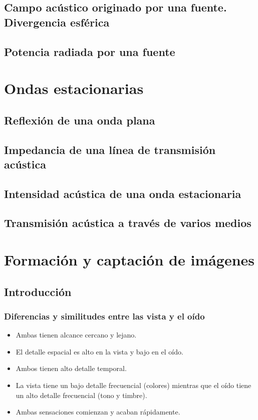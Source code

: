 \documentclass[a4paper]{book}
\begin{document}
\section{Campo acústico originado por una fuente. Divergencia esférica}
\section{Potencia radiada por una fuente}

\chapter{Ondas estacionarias}
\section{Reflexión de una onda plana}
\section{Impedancia de una línea de transmisión acústica}
\section{Intensidad acústica de una onda estacionaria}
\section{Transmisión acústica a través de varios medios}

\chapter{Formación y captación de imágenes}

\section{Introducción}

\subsection{Diferencias y similitudes entre las vista y el oído}
\begin{itemize}
	\item Ambas tienen alcance cercano y lejano.
	\item El detalle espacial es alto en la vista y bajo en el oído.
	\item Ambos tienen alto detalle temporal.
	\item La vista tiene un bajo detalle frecuencial (colores) mientras que el oído tiene un alto detalle frecuencial (tono y timbre).
	\item Ambas sensaciones comienzan y acaban rápidamente.
\end{itemize}
\end{document}

